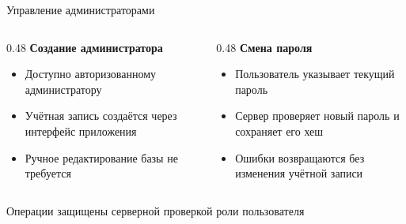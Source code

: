 \documentclass[aspectratio=169]{beamer}
\begin{document}
\begin{frame}{Управление администраторами}
  \begin{columns}[T,onlytextwidth]
    \begin{column}{0.48\textwidth}
      \textbf{Создание администратора}
      \begin{itemize}
        \item Доступно авторизованному администратору
        \item Учётная запись создаётся через интерфейс приложения
        \item Ручное редактирование базы не требуется
      \end{itemize}
    \end{column}
    \begin{column}{0.48\textwidth}
      \textbf{Смена пароля}
      \begin{itemize}
        \item Пользователь указывает текущий пароль
        \item Сервер проверяет новый пароль и сохраняет его хеш
        \item Ошибки возвращаются без изменения учётной записи
      \end{itemize}
    \end{column}
  \end{columns}

  \vfill
  \centering
  Операции защищены серверной проверкой роли пользователя
\end{frame}
\end{document}
